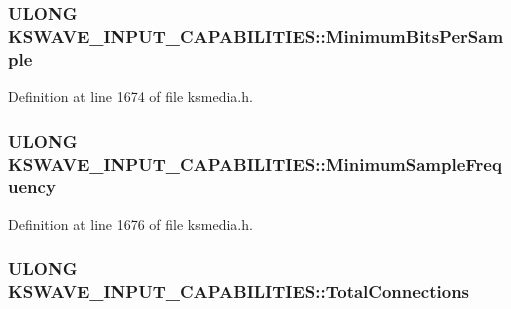 \subsubsection[{\texorpdfstring{Minimum\+Bits\+Per\+Sample}{MinimumBitsPerSample}}]{\setlength{\rightskip}{0pt plus 5cm}U\+L\+O\+NG K\+S\+W\+A\+V\+E\+\_\+\+I\+N\+P\+U\+T\+\_\+\+C\+A\+P\+A\+B\+I\+L\+I\+T\+I\+E\+S\+::\+Minimum\+Bits\+Per\+Sample}\hypertarget{struct_k_s_w_a_v_e___i_n_p_u_t___c_a_p_a_b_i_l_i_t_i_e_s_add8ad7910686178eff800eeddba480da}{}\label{struct_k_s_w_a_v_e___i_n_p_u_t___c_a_p_a_b_i_l_i_t_i_e_s_add8ad7910686178eff800eeddba480da}


Definition at line 1674 of file ksmedia.\+h.

\subsubsection[{\texorpdfstring{Minimum\+Sample\+Frequency}{MinimumSampleFrequency}}]{\setlength{\rightskip}{0pt plus 5cm}U\+L\+O\+NG K\+S\+W\+A\+V\+E\+\_\+\+I\+N\+P\+U\+T\+\_\+\+C\+A\+P\+A\+B\+I\+L\+I\+T\+I\+E\+S\+::\+Minimum\+Sample\+Frequency}\hypertarget{struct_k_s_w_a_v_e___i_n_p_u_t___c_a_p_a_b_i_l_i_t_i_e_s_a4736003740f49a9e1473990c0c2fb4e7}{}\label{struct_k_s_w_a_v_e___i_n_p_u_t___c_a_p_a_b_i_l_i_t_i_e_s_a4736003740f49a9e1473990c0c2fb4e7}


Definition at line 1676 of file ksmedia.\+h.

\subsubsection[{\texorpdfstring{Total\+Connections}{TotalConnections}}]{\setlength{\rightskip}{0pt plus 5cm}U\+L\+O\+NG K\+S\+W\+A\+V\+E\+\_\+\+I\+N\+P\+U\+T\+\_\+\+C\+A\+P\+A\+B\+I\+L\+I\+T\+I\+E\+S\+::\+Total\+Connections}\hypertarget{struct_k_s_w_a_v_e___i_n_p_u_t___c_a_p_a_b_i_l_i_t_i_e_s_a7dd51b6ee1cf93d356ad0e2c63c9f82e}{}\label{struct_k_s_w_a_v_e___i_n_p_u_t___c_a_p_a_b_i_l_i_t_i_e_s_a7dd51b6ee1cf93d356ad0e2c63c9f82e}


